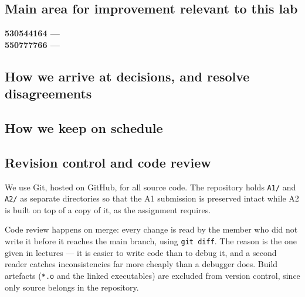 \documentclass[10pt]{article}
\begin{document}
\subsection{Main area for improvement relevant to this lab}
\textbf{530544164 ---} %
\\[0.3cm]
\textbf{550777766 ---} %

\subsection{How we arrive at decisions, and resolve disagreements}

\subsection{How we keep on schedule}

\subsection{Revision control and code review}
We use Git, hosted on GitHub, for all source code. The repository holds
\texttt{A1/} and \texttt{A2/} as separate directories so that the A1
submission is preserved intact while A2 is built on top of a copy of it, as
the assignment requires.

Code review happens on merge: every change is read by the member who did not
write it before it reaches the main branch, using \texttt{git diff}. The
reason is the one given in lectures --- it is easier to write code than to
debug it, and a second reader catches inconsistencies far more cheaply than a
debugger does. Build artefacts (\texttt{*.o} and the linked executables) are
excluded from version control, since only source belongs in the repository.



\end{document}
